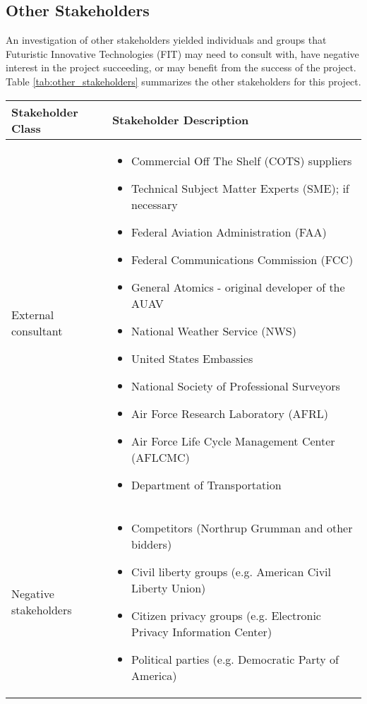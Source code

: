 \begin{fullwidth}
\subsection{Other Stakeholders}
    An investigation of other stakeholders yielded individuals and groups that Futuristic Innovative Technologies (FIT) may need to consult with, have negative interest in the project succeeding, or may benefit from the success of the project. Table \ref{tab:other_stakeholders} summarizes the other stakeholders for this project.
    \begin{longtable}{ | p{5cm} | p{12cm} | }
        \hline
        \rowcolor[gray]{.8}
        \textbf{Stakeholder Class} &  \textbf{Stakeholder Description} \\
        \hline
        External consultant & 
        \begin{itemize}
            \item Commercial Off The Shelf (COTS) suppliers
            \item Technical Subject Matter Experts (SME); if necessary
            \item Federal Aviation Administration (FAA)
            \item Federal Communications Commission (FCC)
            \item General Atomics - original developer of the AUAV
            \item National Weather Service (NWS)
            \item United States Embassies
            \item National Society of Professional Surveyors
            \item Air Force Research Laboratory (AFRL)
            \item Air Force Life Cycle Management Center (AFLCMC)
            \item Department of Transportation
        \end{itemize} \\
        \hline
        Negative stakeholders &
        \begin{itemize}
            \item Competitors (Northrup Grumman and other bidders)
            \item Civil liberty groups (e.g. American Civil Liberty Union)
            \item Citizen privacy groups (e.g. Electronic Privacy Information Center)
            \item Political parties (e.g. Democratic Party of America)

\end{itemize}
\end{longtable}
\end{fullwidth}
